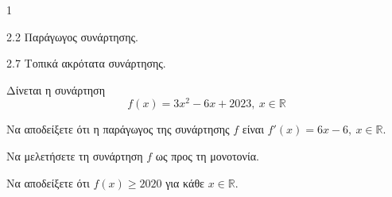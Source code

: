 \begin{ylh}{1}
    \item 2.2 Παράγωγος συνάρτησης.
    \item 2.7 Τοπικά ακρότατα συνάρτησης.
\end{ylh}
Δίνεται η συνάρτηση
\[ f(x) = 3x^2 - 6x + 2023, \ x \in \mathbb{R} \]
\begin{alist}
\item Να αποδείξετε ότι η παράγωγος της συνάρτησης $f$ είναι $f'(x) = 6x - 6, \ x \in \mathbb{R}$. 
\item Να μελετήσετε τη συνάρτηση $f$ ως προς τη μονοτονία. 
\item Να αποδείξετε ότι $f(x) \geq 2020$ για κάθε $x \in \mathbb{R}$. 
\end{alist}

